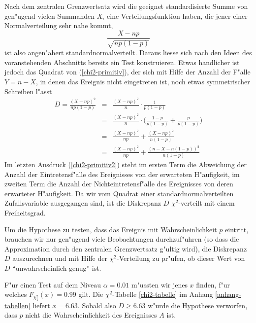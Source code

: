 Nach dem zentralen Grenzwertsatz wird die geeignet standardisierte Summe
von gen"ugend vielen Summanden $X_i$ eine Verteilungsfunktion haben,
die jener einer Normalverteilung sehr nahe kommt, 
\begin{equation}
\frac{X-np}{\sqrt{np(1-p)}}
\label{chi2-primitiv}
\end{equation}
ist also angen"ahert standardnormalverteilt. Daraus liesse sich nach den
Ideen des voranstehenden Abschnitts bereits ein Test konstruieren.
Etwas handlicher ist jedoch das Quadrat von (\ref{chi2-primitiv}), der
sich mit Hilfe der Anzahl der F"alle $Y=n-X$, in denen das Ereignis
nicht eingetreten ist, noch etwas symmetrischer Schreiben l"asst
\begin{eqnarray}
D=\frac{(X-np)^2}{np(1-p)}
&=&
\frac{(X-np)^2}{n}\cdot \frac{1}{p(1-p)}\nonumber\\
&=&
\frac{(X-np)^2}{n}\cdot
\biggl(
\frac{1-p}{p(1-p)} +
\frac{p}{p(1-p)}
\biggr)\nonumber\\
&=&\frac{(X-np)^2}{np}+\frac{(X-np)^2}{n(1-p)}\nonumber\\
&=&\frac{(X-np)^2}{np}+\frac{(n-X-n(1-p))^2}{n(1-p)}\label{chi2-primitiv2}
\end{eqnarray}
Im letzten Ausdruck (\ref{chi2-primitiv2})
steht im ersten Term die Abweichung der
Anzahl der Eintretensf"alle des Ereignisses von der erwarteten H"aufigkeit,
im zweiten Term die Anzahl der Nichteintretensf"alle des Ereignisses
von deren erwarteter H"aufigkeit.
Da wir vom Quadrat einer standardnormalverteilten Zufallsvariable ausgegangen
sind, ist die Diskrepanz $D$ $\chi^2$-verteilt mit einem Freiheitsgrad.

Um die Hypothese zu testen, dass das Ereignis mit Wahrscheinlichkeit $p$
eintritt, brauchen wir nur gen"ugend viele Beobachtungen durchzuf"uhren
(so dass die Approximation durch den zentralen Grenzwertsatz g"ultig wird),
die Diskrepanz $D$ auszurechnen und mit Hilfe der $\chi^2$-Verteilung
zu pr"ufen, ob dieser Wert von $D$ ``unwahrscheinlich genug'' ist.

F"ur einen Test auf dem Niveau $\alpha=0.01$ m"ussten wir jenes
$x$ finden, f"ur welches $F_{\chi^2_1}(x)=0.99$ gilt. Die $\chi^2$-Tabelle
\ref{chi2-tabelle} im Anhang \ref{anhang-tabellen}
liefert $x=6.63$. Sobald also $D\ge 6.63$ w"urde die Hypothese verworfen,
dass $p$ nicht die Wahrscheinlichkeit des Ereignisses $A$ ist.

